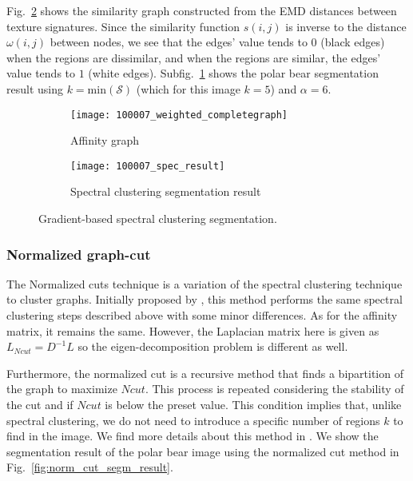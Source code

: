 Fig.\ \ref{fig:spectral_clustering_process} shows the similarity graph constructed from the EMD distances between texture signatures. Since the similarity function $s(i, j)$ is inverse to the distance $\omega (i, j)$ between nodes, we see that the edges' value tends to $0$ (black edges) when the regions are dissimilar, and when the regions are similar, the edges' value tends to $1$ (white edges). Subfig.\ \ref{fig:spectral_clustering_segm_result} shows the polar bear segmentation result using $k = \mathrm{min}(\mathcal{S})$ (which for this image $k =5$) and $\alpha = 6$.

\begin{figure}[!ht]
    \centering
    \begin{subfigure}[b]{0.49\textwidth}
    	\texttt{[image: 100007\_weighted\_completegraph]} 
    	\caption{Affinity graph}
    \end{subfigure}      
    \begin{subfigure}[b]{0.49\textwidth}
        \texttt{[image: 100007\_spec\_result]}
        \caption{Spectral clustering segmentation result}
        \label{fig:spectral_clustering_segm_result} 
    \end{subfigure}    
	\caption{Gradient-based spectral clustering segmentation.}\label{fig:spectral_clustering_process}    
\end{figure}


\subsubsection{Normalized graph-cut}
The Normalized cuts technique is a variation of the spectral clustering technique to cluster graphs. Initially proposed by \cite{JianboShi.Malik:PAMI:2000}, this method performs the same spectral clustering steps described above with some minor differences. As for the affinity matrix, it remains the same. However, the Laplacian matrix here is given as
$L_{Ncut} = D^{-1}L$
so the eigen-decomposition problem is different as well.

Furthermore, the normalized cut is a recursive method that finds a bipartition of the graph to maximize $Ncut$. This process is repeated considering the stability of the cut and if $Ncut$ is below the preset value. This condition implies that, unlike spectral clustering, we do not need to introduce a specific number of regions $k$ to find in the image. We find more details about this method in \cite{JianboShi.Malik:PAMI:2000}. We show the segmentation result of the polar bear image using the normalized cut method in Fig.\ \ref{fig:norm_cut_segm_result}. 

